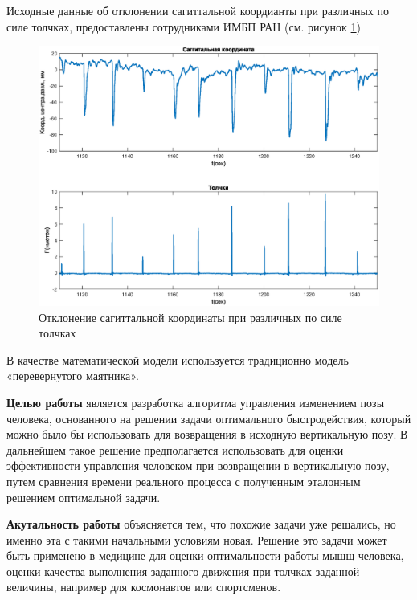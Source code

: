 \documentclass[a4paper,12pt, openany]{book}
\theoremstyle{plain} %
\theoremstyle{definition} %
\theoremstyle{remark} %
\numberwithin{equation}{chapter}
\begin{document}
{Исходные данные об отклонении сагиттальной коордианты при различных по силе толчках, предоставлены сотрудниками ИМБП РАН (см. рисунок \ref{fig:pushes})
\begin{figure}[h!]
    \centering
    \includegraphics[width=1\linewidth]{sagg_and_pushes.eps}
    \caption{Отклонение сагиттальной координаты при различных по силе толчках}
    \label{fig:pushes}
\end{figure}

В качестве математической модели
используется традиционно модель «перевернутого маятника»\cite{PAKrychinin,gurfincel}.


\textbf{Целью работы} является разработка алгоритма управления изменением позы человека, основанного на решении задачи оптимального быстродействия,
который можно было бы использовать для возвращения в исходную вертикальную позу. В дальнейшем
такое решение предполагается использовать для оценки эффективности управления человеком
при возвращении в вертикальную позу, путем сравнения
времени реального процесса с полученным эталонным решением оптимальной задачи.

\textbf{Акутальность работы} объясняется тем, что похожие задачи уже решались, но именно эта с такими начальными условиям новая.
Решение это задачи может быть применено в медицине для оценки оптимальности работы мышщ человека, оценки качества выполнения заданного движения
при толчках заданной величины, например для космонавтов или спортсменов.

}
\end{document}
